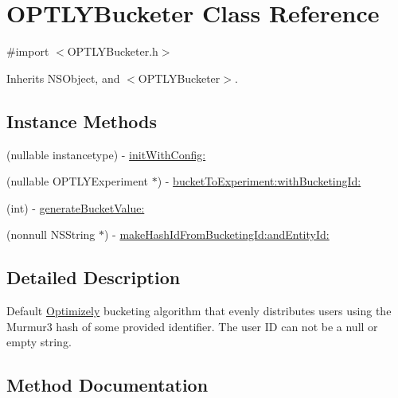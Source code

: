 \hypertarget{interface_o_p_t_l_y_bucketer}{}\section{O\+P\+T\+L\+Y\+Bucketer Class Reference}
\label{interface_o_p_t_l_y_bucketer}


{\ttfamily \#import $<$O\+P\+T\+L\+Y\+Bucketer.\+h$>$}



Inherits N\+S\+Object, and $<$\+O\+P\+T\+L\+Y\+Bucketer$>$.

\subsection*{Instance Methods}
\begin{DoxyCompactItemize}
\item 
(nullable instancetype) -\/ \mbox{\hyperlink{interface_o_p_t_l_y_bucketer_a7bfb8596f8a8671c1df60e2b363ba783}{init\+With\+Config\+:}}
\item 
(nullable O\+P\+T\+L\+Y\+Experiment $\ast$) -\/ \mbox{\hyperlink{interface_o_p_t_l_y_bucketer_a1d62331bfcbb1264333256918f40a030}{bucket\+To\+Experiment\+:with\+Bucketing\+Id\+:}}
\item 
(int) -\/ \mbox{\hyperlink{interface_o_p_t_l_y_bucketer_a18416626947bc0b34c3a0e4a3f90bb87}{generate\+Bucket\+Value\+:}}
\item 
(nonnull N\+S\+String $\ast$) -\/ \mbox{\hyperlink{interface_o_p_t_l_y_bucketer_ac2a6df329e8a9960499c272b1c0b47a9}{make\+Hash\+Id\+From\+Bucketing\+Id\+:and\+Entity\+Id\+:}}
\end{DoxyCompactItemize}


\subsection{Detailed Description}
Default \mbox{\hyperlink{interface_optimizely}{Optimizely}} bucketing algorithm that evenly distributes users using the Murmur3 hash of some provided identifier. The user ID can not be a null or empty string. 

\subsection{Method Documentation}
\mbox{\label{interface_o_p_t_l_y_bucketer_a1d62331bfcbb1264333256918f40a030}} 
